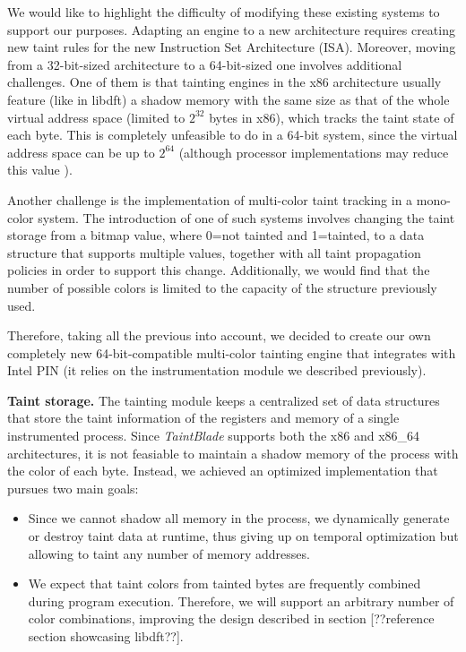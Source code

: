 \documentclass[conference]{IEEEtran}
\begin{document}
We would like to highlight the difficulty of modifying these existing systems
to support our purposes. Adapting an engine to a new architecture requires
creating new taint rules for the new Instruction Set Architecture (ISA).
Moreover, moving from a 32-bit-sized architecture to a 64-bit-sized one
involves additional challenges. One of them is that tainting engines in the x86
architecture usually feature (like in libdft) a shadow memory with the same
size as that of the whole virtual address space (limited to $2^{32}$ bytes in
x86), which tracks the taint state of each byte. This is completely unfeasible
to do in a 64-bit system, since the virtual address space can be up to $2^{64}$
(although processor implementations may reduce this value
\cite{book_practical_binary_analysis_p13}).

Another challenge is the implementation of multi-color taint tracking in a
mono-color system. The introduction of one of such systems involves changing
the taint storage from a bitmap value, where 0=not tainted and 1=tainted, to a
data structure that supports multiple values, together with all taint
propagation policies in order to support this change. Additionally, we would
find that the number of possible colors is limited to the capacity of the
structure previously used.

Therefore, taking all the previous into account, we decided to create our own
completely new 64-bit-compatible multi-color tainting engine that integrates
with Intel PIN (it relies on the instrumentation module we described
previously).

\textbf{Taint storage.} The tainting module keeps a centralized set
of data structures that store the taint information of the registers and memory of
a single instrumented process.
Since \textit{TaintBlade} supports both the x86 and x86\_64 architectures, it is not feasiable to
maintain a shadow memory of the process with the color of each byte. Instead, we
achieved an optimized implementation that pursues two main goals:
\begin{itemize}
    \item Since we cannot shadow all memory in the process, we dynamically generate or
          destroy taint data at runtime, thus giving up on temporal optimization but
          allowing to taint any number of memory addresses.
    \item We expect that taint colors from tainted bytes are frequently combined during
          program execution. Therefore, we will support an arbitrary number of color
          combinations, improving the design described in section [??reference section
            showcasing libdft??].
\end{itemize}
\end{document}
